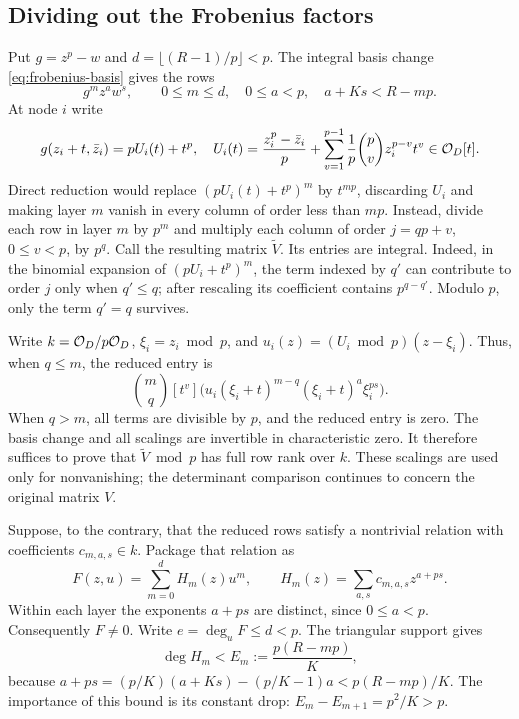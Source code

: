 \subsection{Dividing out the Frobenius factors}
Put $g=z^p-w$ and $d=\lfloor(R-1)/p\rfloor<p$. The integral basis change
\eqref{eq:frobenius-basis} gives the rows
\begin{equation}\label{eq:g-basis}
 g^m z^a w^s,\qquad 0\leq m\leq d,\quad 0\leq a<p,\quad a+Ks<R-mp.
\end{equation}
At node $i$ write
\[
 g(z_i+t,\bar z_i)=pU_i(t)+t^p,
 \quad
 U_i(t)=\frac{z_i^p-\bar z_i}{p}
       +\sum_{v=1}^{p-1}\frac1p\binom pv z_i^{p-v}t^v\in\mathcal O_D[t].
\]
Direct reduction would replace $(pU_i(t)+t^p)^m$ by $t^{mp}$, discarding
$U_i$ and making layer $m$ vanish in every column of order less than $mp$.
Instead, divide each row in layer $m$ by $p^m$ and multiply each column of order
$j=qp+v$, $0\leq v<p$, by $p^q$. Call the resulting matrix $\widetilde V$.
Its entries are integral. Indeed, in the binomial expansion of
$(pU_i+t^p)^m$, the term indexed by $q'$ can contribute to order $j$ only
when $q'\leq q$; after rescaling its coefficient contains $p^{q-q'}$.
Modulo $p$, only the term $q'=q$ survives.

Write $k=\mathcal O_D/p\mathcal O_D$, $\xi_i=z_i\bmod p$, and
$u_i(z)=(U_i\bmod p)(z-\xi_i)$. Thus, when $q\leq m$, the reduced entry is
\begin{equation}\label{eq:scaled-entry}
 \binom mq[t^v]\bigl(u_i(\xi_i+t)^{m-q}(\xi_i+t)^a\xi_i^{ps}\bigr).
\end{equation}
When $q>m$, all terms are divisible by $p$, and the reduced entry is zero.
The basis change and all scalings are invertible in characteristic zero.
It therefore suffices to prove that $\widetilde V\bmod p$ has full row rank
over $k$. These scalings are used only for nonvanishing; the determinant
comparison continues to concern the original matrix $V$.

Suppose, to the contrary, that the reduced rows satisfy a nontrivial relation
with coefficients $c_{m,a,s}\in k$. Package that relation as
\begingroup{}
\begin{equation}\label{eq:rank-F}
 F(z,u)=\sum_{m=0}^d H_m(z)u^m,\qquad
 H_m(z)=\sum_{a,s}c_{m,a,s}z^{a+ps}.
\end{equation}
\endgroup
Within each layer the exponents $a+ps$ are distinct, since $0\leq a<p$.
Consequently $F\ne0$. Write $e=\deg_uF\leq d<p$. The triangular support gives
\begin{equation}\label{eq:rank-degree}
 \deg H_m<E_m:=\frac{p(R-mp)}K,
\end{equation}
because
$a+ps=(p/K)(a+Ks)-(p/K-1)a<p(R-mp)/K$.
The importance of this bound is its constant drop:
$E_m-E_{m+1}=p^2/K>p$.

